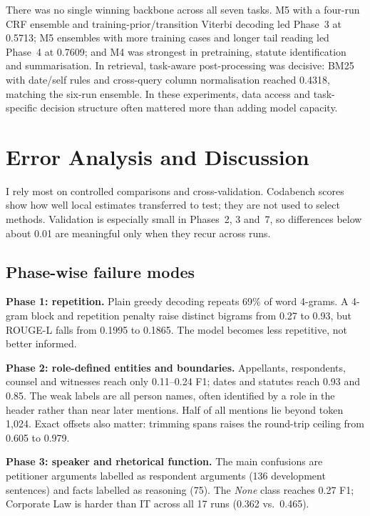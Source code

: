 \documentclass[11pt, oneside]{article}
\begin{document}
\noindent There was no single winning backbone across all seven tasks. M5 with a four-run CRF ensemble and
training-prior/transition Viterbi decoding led Phase~3 at 0.5713; M5 ensembles with more training cases and longer
tail reading led Phase~4 at 0.7609; and M4 was strongest in pretraining, statute identification and summarisation.
In retrieval, task-aware post-processing was decisive: BM25 with date/self rules and cross-query column
normalisation reached 0.4318, matching the six-run ensemble. In these experiments, data access and task-specific
decision structure often mattered more than adding model capacity.

\section{Error Analysis and Discussion}
I rely most on controlled comparisons and cross-validation. Codabench scores show how well local estimates
transferred to test; they are not used to select methods. Validation is especially small in Phases~2, 3 and~7, so
differences below about 0.01 are meaningful only when they recur across runs.

\subsection{Phase-wise failure modes}
\textbf{Phase 1: repetition.} Plain greedy decoding repeats 69\% of word 4-grams. A 4-gram block and repetition
penalty raise distinct bigrams from 0.27 to 0.93, but ROUGE-L falls from 0.1995 to 0.1865. The model becomes less
repetitive, not better informed.

\textbf{Phase 2: role-defined entities and boundaries.} Appellants, respondents, counsel and witnesses reach only
0.11--0.24 F1; dates and statutes reach 0.93 and 0.85. The weak labels are all person names, often identified by a
role in the header rather than near later mentions. Half of all mentions lie beyond token 1{,}024. Exact offsets
also matter: trimming spans raises the round-trip ceiling from 0.605 to 0.979.

\textbf{Phase 3: speaker and rhetorical function.} The main confusions are petitioner arguments labelled as
respondent arguments (136 development sentences) and facts labelled as reasoning (75). The \emph{None} class reaches
0.27 F1; Corporate Law is harder than IT across all 17 runs (0.362 vs.\ 0.465).
\end{document}
